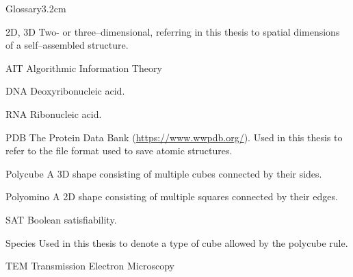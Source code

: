 \begin{mclistof}{Glossary}{3.2cm}

\item[2D, 3D] Two- or three--dimensional, referring in this thesis to spatial dimensions of a self--assembled structure.
\item[AIT] Algorithmic Information Theory
\item[DNA] Deoxyribonucleic acid.
\item[RNA] Ribonucleic acid.
\item[PDB] The Protein Data Bank (\url{https://www.wwpdb.org/}). Used in this thesis to refer to the file format used to save atomic structures.
\item[Polycube] A 3D shape consisting of multiple cubes connected by their sides.
\item[Polyomino] A 2D shape consisting of multiple squares connected by their edges.
\item[SAT] Boolean satisfiability.
\item[Species] Used in this thesis to denote a type of cube allowed by the polycube rule.
\item[TEM] Transmission Electron Microscopy 

\end{mclistof} 
